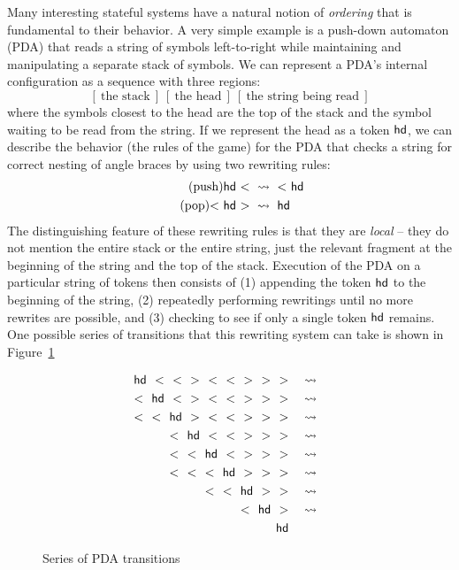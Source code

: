 Many interesting stateful systems have a natural notion of {\it
  ordering} that is fundamental to their behavior. A very simple
example is a push-down automaton (PDA) that reads a string of symbols
left-to-right while maintaining and manipulating a separate stack of
symbols. We can represent a PDA's internal configuration as a sequence
with three regions:
\[
[~\mbox{the stack}~]
~
[~\mbox{the head}~]
~
[~\mbox{the string being read}~]
\]
where the symbols closest to the head are the top of the stack and the
symbol waiting to be read from the string. If we represent the head as
a token ${\sf hd}$, we can describe the behavior (the rules of the
game) for the PDA that checks a string for correct
nesting of angle braces by using two rewriting rules:
\begin{align}
\tag{push} {\sf hd}~{<} ~&\rightsquigarrow~ {<}~{\sf hd}
\\
\tag{pop} {<}~{\sf hd}~{>} ~&\rightsquigarrow~ {\sf hd}
\end{align}
The distinguishing feature of these rewriting rules is that they are
{\it local} -- they do not mention the entire stack or the entire
string, just the relevant fragment at the beginning of the string and
the top of the stack. Execution of the PDA on a particular string of
tokens then consists of (1) appending the token ${\sf hd}$ to the
beginning of the string, (2) repeatedly performing rewritings until no
more rewrites are possible, and (3) checking to see if only a single
token ${\sf hd}$ remains. One possible series of transitions that this
rewriting system can take is shown in Figure~\ref{fig:pda-transitions}

\begin{figure}
\begin{align*}
{\sf hd}~~{<}~~{<}~~{>}~~{<}~~{<}~~{>}~~{>}~~{>}
& ~~~\rightsquigarrow~~\\
{<}~~{\sf hd}~~{<}~~{>}~~{<}~~{<}~~{>}~~{>}~~{>}
& ~~~\rightsquigarrow~~\\
{<}~~{<}~~{\sf hd}~~{>}~~{<}~~{<}~~{>}~~{>}~~{>}
& ~~~\rightsquigarrow~~\\
{<}~~{\sf hd}~~{<}~~{<}~~{>}~~{>}~~{>}
& ~~~\rightsquigarrow~~\\
{<}~~{<}~~{\sf hd}~~{<}~~{>}~~{>}~~{>}
& ~~~\rightsquigarrow~~\\
{<}~~{<}~~{<}~~{\sf hd}~~{>}~~{>}~~{>}
& ~~~\rightsquigarrow~~\\
{<}~~{<}~~{\sf hd}~~{>}~~{>}
& ~~~\rightsquigarrow~~\\
{<}~~{\sf hd}~~{>}
& ~~~\rightsquigarrow~~\\
{\sf hd} &
\end{align*}
\caption{Series of PDA transitions}
\label{fig:pda-transitions}
\end{figure}

